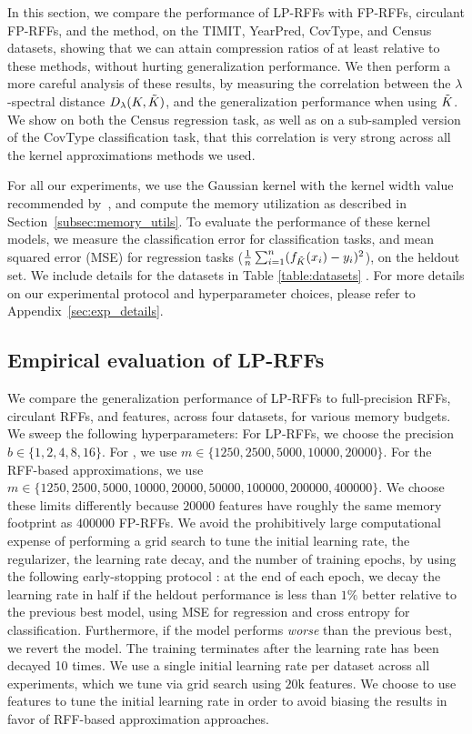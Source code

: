 In this section, we compare the performance of LP-RFFs with FP-RFFs, circulant FP-RFFs, and the \Nystrom method, on the TIMIT, YearPred, CovType, and Census datasets, showing that we can attain compression ratios of at least  relative to these methods, without hurting generalization performance. We then perform a more careful analysis of these results, by measuring the correlation between the $\lambda$-spectral distance $D_{\lambda}(K,\tilde{K})$, and the generalization performance when using $\tilde{K}$. We show on both the Census regression task, as well as on a sub-sampled version of the CovType classification task, that this correlation is very strong  across all the kernel approximations methods we used.

For all our experiments, we use the Gaussian kernel with the kernel width value recommended by~\citet{may2017}, and compute the memory utilization as described in Section~\ref{subsec:memory_utils}. To evaluate the performance of these kernel models, we measure the classification error for classification tasks, and mean squared error (MSE) for regression tasks ($\frac{1}{n}\sum_{i=1}^n (f_{\tilde{K}}(x_i) - y_i)^2$), on the heldout set. We include details for the datasets in Table \ref{table:datasets} . For more details on our experimental protocol and hyperparameter choices, please refer to Appendix~\ref{sec:exp_details}.

\subsection{Empirical evaluation of LP-RFFs}
We compare the generalization performance of LP-RFFs to full-precision RFFs, circulant RFFs, and \Nystrom features, across four datasets, for various memory budgets.  We sweep the following hyperparameters: For LP-RFFs, we choose the precision $b \in \{1,2,4,8,16\}$. For \Nystrom, we use $m \in \{1250, 2500, 5000, 10000, 20000\}$.  For the RFF-based approximations, we use $m\in \{1250, 2500, 5000, 10000, 20000, 50000, 100000, 200000, 400000\}$.  We choose these limits differently because $\num[group-separator={,}]{20000}$ \Nystrom features have roughly the same memory footprint as $\num[group-separator={,}]{400000}$ FP-RFFs. We avoid the prohibitively large computational expense of performing a grid search to tune the initial learning rate, the regularizer, the learning rate decay, and the number of training epochs, by using the following early-stopping protocol \citep{X}: at the end of each epoch, we decay the learning rate in half if the heldout performance is less than $1\%$ better relative to the previous best model, using MSE for regression and cross entropy for classification. Furthermore, if the model performs \textit{worse} than the previous best, we revert the model. The training terminates after the learning rate has been decayed 10 times. We use a single initial learning rate per dataset across all experiments, which we tune via grid search using $20\text{k}$ \Nystrom features. We choose to use \Nystrom features to tune the initial learning rate in order to avoid biasing the results in favor of RFF-based approximation approaches. 

